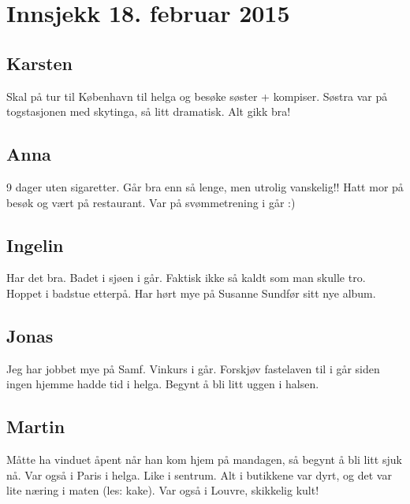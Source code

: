 \documentclass[5p]{elsarticle}
\renewenvironment{abstract}{\global\setbox\absbox=\vbox\bgroup
\hsize=\textwidth\def\baselinestretch{1}%
\noindent\unskip\textbf{Introduksjon}
\par\medskip\noindent\unskip\ignorespaces}
{\egroup}
\begin{document}

\section*{Innsjekk 18. februar 2015}
\subsection*{Karsten}
Skal på tur til København til helga og besøke søster + kompiser. Søstra var på togstasjonen med skytinga, så litt dramatisk. Alt gikk bra!

\subsection*{Anna}
9 dager uten sigaretter. Går bra enn så lenge, men utrolig vanskelig!! Hatt mor på besøk og vært på restaurant. Var på svømmetrening i går :)

\subsection*{Ingelin}
Har det bra. Badet i sjøen i går. Faktisk ikke så kaldt som man skulle tro. Hoppet i badstue etterpå. Har hørt mye på Susanne Sundfør sitt nye album.

\subsection*{Jonas}
Jeg har jobbet mye på Samf. Vinkurs i går. Forskjøv fastelaven til i går siden ingen hjemme hadde tid i helga. Begynt å bli litt uggen i halsen.

\subsection*{Martin}
Måtte ha vinduet åpent når han kom hjem på mandagen, så begynt å bli litt sjuk nå. Var også i Paris i helga. Like i sentrum. Alt i butikkene var dyrt, og det var lite næring i maten (les: kake). Var også i Louvre, skikkelig kult!
\end{document}
